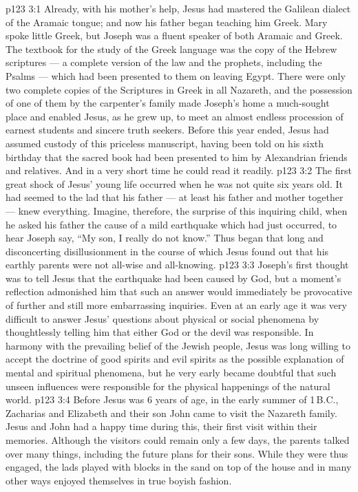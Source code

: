 \vs p123 3:1 Already, with his mother’s help, Jesus had mastered the Galilean dialect of the Aramaic tongue; and now his father began teaching him Greek. Mary spoke little Greek, but Joseph was a fluent speaker of both Aramaic and Greek. The textbook for the study of the Greek language was the copy of the Hebrew scriptures --- a complete version of the law and the prophets, including the Psalms --- which had been presented to them on leaving Egypt. There were only two complete copies of the Scriptures in Greek in all Nazareth, and the possession of one of them by the carpenter’s family made Joseph’s home a much\hyp{}sought place and enabled Jesus, as he grew up, to meet an almost endless procession of earnest students and sincere truth seekers. Before this year ended, Jesus had assumed custody of this priceless manuscript, having been told on his sixth birthday that the sacred book had been presented to him by Alexandrian friends and relatives. And in a very short time he could read it readily.
\vs p123 3:2 \pc The first great shock of Jesus’ young life occurred when he was not quite six years old. It had seemed to the lad that his father --- at least his father and mother together --- knew everything. Imagine, therefore, the surprise of this inquiring child, when he asked his father the cause of a mild earthquake which had just occurred, to hear Joseph say, “My son, I really do not know.” Thus began that long and disconcerting disillusionment in the course of which Jesus found out that his earthly parents were not all\hyp{}wise and all\hyp{}knowing.
\vs p123 3:3 Joseph’s first thought was to tell Jesus that the earthquake had been caused by God, but a moment’s reflection admonished him that such an answer would immediately be provocative of further and still more embarrassing inquiries. Even at an early age it was very difficult to answer Jesus’ questions about physical or social phenomena by thoughtlessly telling him that either God or the devil was responsible. In harmony with the prevailing belief of the Jewish people, Jesus was long willing to accept the doctrine of good spirits and evil spirits as the possible explanation of mental and spiritual phenomena, but he very early became doubtful that such unseen influences were responsible for the physical happenings of the natural world.
\vs p123 3:4 \pc Before Jesus was 6 years of age, in the early summer of 1\,B.C., Zacharias and Elizabeth and their son John came to visit the Nazareth family. Jesus and John had a happy time during this, their first visit within their memories. Although the visitors could remain only a few days, the parents talked over many things, including the future plans for their sons. While they were thus engaged, the lads played with blocks in the sand on top of the house and in many other ways enjoyed themselves in true boyish fashion.
